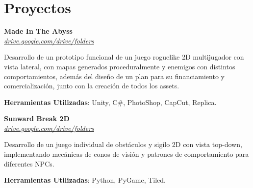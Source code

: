 \section{Proyectos}

\begin{onecolentry}
    \textbf{Made In The Abyss} \\
    \textit{\href{https://drive.google.com/drive/folders/1yEjoHvc1qDIjDSd7rOD395CgNGLbrMai?usp=drive_link}{drive.google.com/drive/folders}}
\end{onecolentry}

\vspace{0.20 cm}
\begin{onecolentry}
    \begin{highlights}
        \item Desarrollo de un prototipo funcional de un juego roguelike 2D multijugador con vista lateral, con mapas generados proceduralmente y enemigos con distintos comportamientos, además del diseño de un plan para su financiamiento y comercialización, junto con la creación de todos los assets.
        \item \textbf{Herramientas Utilizadas}: Unity, C\#, PhotoShop, CapCut, Replica.
    \end{highlights}
\end{onecolentry}

\vspace{0.2 cm}

\begin{onecolentry}
    \textbf{Sunward Break 2D} \\
    \textit{\href{https://drive.google.com/drive/folders/1sLz1S1gJQGhMduDUw5MLdOKH04oDLoP2?usp=sharing}{drive.google.com/drive/folders}}
\end{onecolentry}

\vspace{0.20 cm}
\begin{onecolentry}
    \begin{highlights}        
        \item Desarrollo de un juego individual de obstáculos y sigilo 2D con vista top-down, implementando mecánicas de conos de visión y patrones de comportamiento para diferentes NPCs.
        \item \textbf{Herramientas Utilizadas}: Python, PyGame, Tiled.
    \end{highlights}
\end{onecolentry}

\vspace{0.2 cm}

